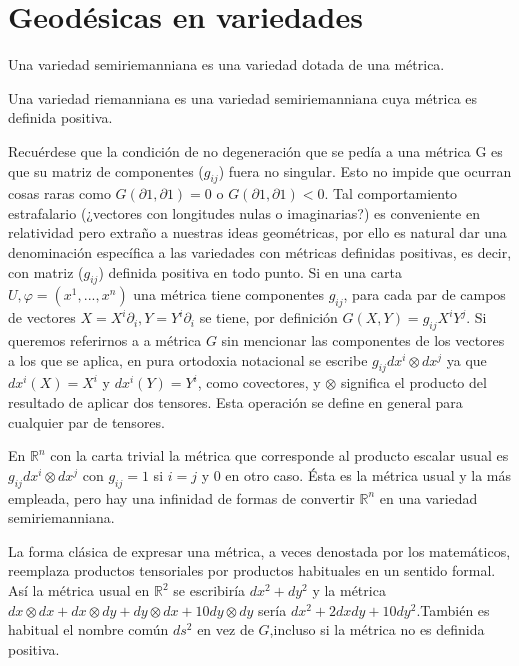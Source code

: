 \documentclass[palatino, bibnumbers]{apuntes}
\begin{document}
\section{Geodésicas en variedades}
\begin{defn} Una variedad semiriemanniana es una variedad dotada de una métrica.
\end{defn}

\begin{defn} Una variedad riemanniana es una variedad semiriemanniana cuya métrica es definida positiva.
\end{defn}

Recuérdese que la condición de no degeneración que se pedía a una métrica G es que su matriz de componentes ($g_{ij}$) fuera no singular. Esto no impide que ocurran cosas raras como $G(∂1, ∂1) = 0$  o $G(∂1, ∂1) < 0$. Tal comportamiento estrafalario (¿vectores con longitudes nulas o imaginarias?) es conveniente en relatividad pero extraño a nuestras ideas geométricas, por ello es natural dar una denominación específica a las variedades con métricas definidas positivas, es decir, con matriz ($g_{ij}$) definida positiva en todo punto.\newline
Si en una carta  $U,φ = (x^1,...,x^n)$  una métrica tiene componentes $g_{ij}$, para cada par de campos de vectores $X = X^i∂_i, Y = Y^i∂_i$ se tiene, por definición $G(X,Y) = g_{ij}X^iY^j$. Si queremos referirnos a a métrica $G$ sin mencionar las componentes de los vectores a los que se aplica, en pura ortodoxia notacional se escribe $g_{ij} dx^i ⊗ dx^j$ ya que $dx^i(X) = X^i$ y $dx^i(Y ) = Y^i$, como covectores, y $⊗$ significa el producto del resultado de aplicar dos tensores. Esta operación se define en general para cualquier par de tensores.
\begin{example}En $ℝ^n$ con la carta trivial la métrica que corresponde al producto escalar usual es $g_{ij}dx^i ⊗dx^j$ con $g_{ij} = 1$ si $i = j$ y 0 en otro caso. Ésta es la métrica usual y la más empleada, pero hay una infinidad de formas de convertir $ℝ^n$ en una variedad semiriemanniana.
\end{example}

La forma clásica de expresar una métrica, a veces denostada por los matemáticos, reemplaza productos tensoriales por productos habituales en un sentido formal. Así la métrica usual en $ℝ^2$ se escribiría $dx^2+dy^2$ y la métrica $dx⊗dx+dx⊗dy+dy⊗dx+10dy⊗dy$ sería $dx^2+2dxdy+10dy^2$.También es habitual el nombre común $ds^2$ en vez de $G$,incluso si la métrica no es definida positiva.
\end{document}
